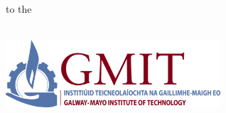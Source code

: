 \begin{titlepage}
  \vspace{2mm}

  \begin{center}
    \begin{minipage}[t]{\textwidth}
      \centering
      {\small to the} \\
      \thesisdepartment \\
      \thesisinstitute
    \end{minipage}
  \end{center}

  \vspace{8mm}

  \begin{center}
    \begin{minipage}[t][30mm]{\textwidth}
      \centering
      \includegraphics[width=80mm]{img/gmit-logo.jpg} \\[4mm]
    \end{minipage}
  \end{center}

\end{titlepage}